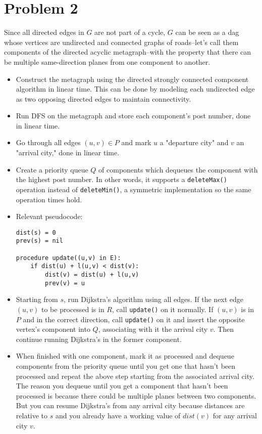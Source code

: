 \documentclass[11pt]{article}
\begin{document}
\newpage
\section*{Problem 2}
Since all directed edges in $G$ are not part of a cycle, $G$ can be seen as a dag whose vertices are undirected and connected graphs of roads--let's call them components of the directed acyclic metagraph--with the property that there can be multiple same-direction planes from one component to another.
\begin{itemize}
\item Construct the metagraph using the directed strongly connected component algorithm in linear time. This can be done by modeling each undirected edge as two opposing directed edges to maintain connectivity.
\item Run DFS on the metagraph and store each component's post number, done in linear time.
\item Go through all edges $(u,v)\in P$ and mark $u$ a "departure city" and $v$ an "arrival city," done in linear time.
\item Create a priority queue $Q$ of components which dequeues the component with the highest post number. In other words, it supports a \texttt{deleteMax()} operation instead of \texttt{deleteMin()}, a symmetric implementation so the same operation times hold.
\item Relevant pseudocode:
\begin{verbatim}
dist(s) = 0
prev(s) = nil

procedure update((u,v) in E):
    if dist(u) + l(u,v) < dist(v):
        dist(v) = dist(u) + l(u,v)
        prev(v) = u
\end{verbatim}
\item Starting from $s$, run Dijkstra's algorithm using all edges. If the next edge $(u,v)$ to be processed is in $R$, call \texttt{update()} on it normally. If $(u,v)$ is in $P$ and in the correct direction, call \texttt{update()} on it and insert the opposite vertex's component into $Q$, associating with it the arrival city $v$. Then continue running Dijkstra's in the former component.
\item When finished with one component, mark it as processed and dequeue components from the priority queue until you get one that hasn't been processed and repeat the above step starting from the associated arrival city. The reason you dequeue until you get a component that hasn't been processed is because there could be multiple planes between two components. But you can resume Dijkstra's from any arrival city because distances are relative to $s$ and you already have a working value of $dist(v)$ for any arrival city $v$.
\end{itemize}
\end{document}
